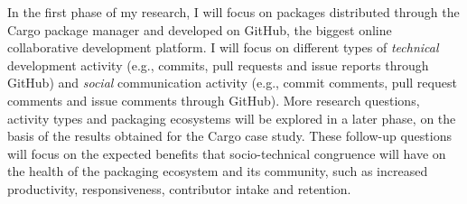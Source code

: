 In the first phase of my research, I will focus on packages distributed through the Cargo package manager and developed on GitHub, the biggest online collaborative development platform.
%
I will focus on different types of \emph{technical} development activity (e.g., commits, pull requests and issue reports through GitHub) and \emph{social} communication activity (e.g., commit comments, pull request comments and issue comments through GitHub). 
%
More research questions, activity types and packaging ecosystems will be explored in a later phase, on the basis of the results obtained for the Cargo case study. These follow-up questions will focus on the expected benefits that socio-technical congruence will have on the health of the packaging ecosystem and its community, such as increased productivity, responsiveness, contributor intake and retention.